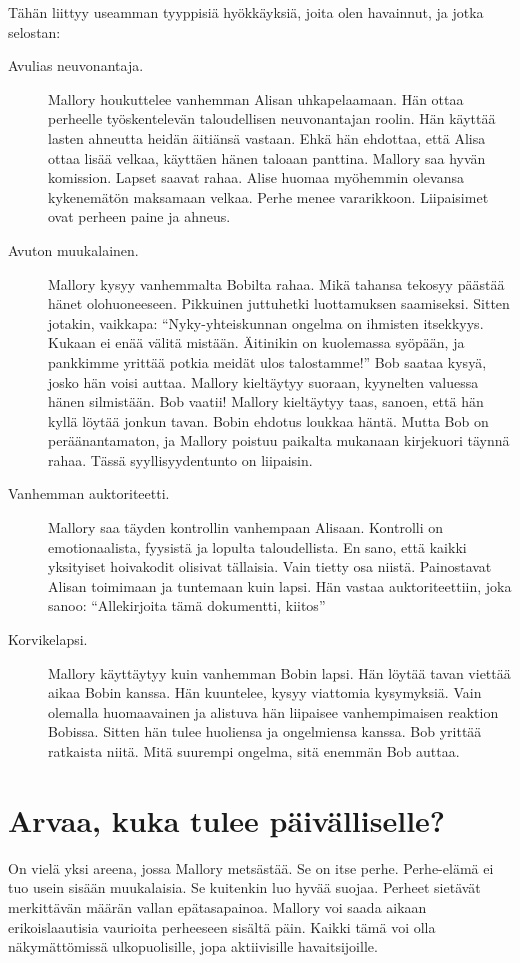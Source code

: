 Tähän liittyy useamman tyyppisiä hyökkäyksiä, joita olen havainnut, ja jotka selostan:
\begin{description}
\item[Avulias neuvonantaja.] Mallory houkuttelee vanhemman Alisan uhkapelaamaan. Hän ottaa perheelle työskentelevän taloudellisen neuvonantajan roolin. Hän käyttää lasten ahneutta heidän äitiänsä vastaan. Ehkä hän ehdottaa, että Alisa ottaa lisää velkaa, käyttäen hänen taloaan panttina. Mallory saa hyvän komission. Lapset saavat rahaa. Alise huomaa myöhemmin olevansa kykenemätön maksamaan velkaa. Perhe menee vararikkoon. Liipaisimet ovat perheen paine ja ahneus.
\item[Avuton muukalainen.] Mallory kysyy vanhemmalta Bobilta rahaa. Mikä tahansa tekosyy päästää hänet olohuoneeseen. Pikkuinen juttuhetki luottamuksen saamiseksi. Sitten jotakin, vaikkapa: ``Nyky-yhteiskunnan ongelma on ihmisten itsekkyys. Kukaan ei enää välitä mistään. Äitinikin on kuolemassa syöpään, ja pankkimme yrittää potkia meidät ulos talostamme!'' Bob saataa kysyä, josko hän voisi auttaa. Mallory kieltäytyy suoraan, kyynelten valuessa hänen silmistään. Bob vaatii! Mallory kieltäytyy taas, sanoen, että hän kyllä löytää jonkun tavan. Bobin ehdotus loukkaa häntä. Mutta Bob on peräänantamaton, ja Mallory poistuu paikalta mukanaan kirjekuori täynnä rahaa. Tässä syyllisyydentunto on liipaisin.
\item[Vanhemman auktoriteetti.] Mallory saa täyden kontrollin vanhempaan Alisaan. Kontrolli on emotionaalista, fyysistä ja lopulta taloudellista. En sano, että kaikki yksityiset hoivakodit olisivat tällaisia. Vain tietty osa niistä. Painostavat Alisan toimimaan ja tuntemaan kuin lapsi. Hän vastaa auktoriteettiin, joka sanoo: ``Allekirjoita tämä dokumentti, kiitos''
\item[Korvikelapsi.] Mallory käyttäytyy kuin vanhemman Bobin lapsi. Hän löytää tavan viettää aikaa Bobin kanssa. Hän kuuntelee, kysyy viattomia kysymyksiä. Vain olemalla huomaavainen ja alistuva hän liipaisee vanhempimaisen reaktion Bobissa. Sitten hän tulee huoliensa ja ongelmiensa kanssa. Bob yrittää ratkaista niitä. Mitä suurempi ongelma, sitä enemmän Bob auttaa.
\end{description}

\section{Arvaa, kuka tulee päivälliselle?}

On vielä yksi areena, jossa Mallory metsästää. Se on itse perhe. Perhe-elämä ei tuo usein sisään muukalaisia. Se kuitenkin luo hyvää suojaa. Perheet sietävät merkittävän määrän vallan epätasapainoa. Mallory voi saada aikaan erikoislaautisia vaurioita perheeseen sisältä päin. Kaikki tämä voi olla näkymättömissä ulkopuolisille, jopa aktiivisille havaitsijoille.

